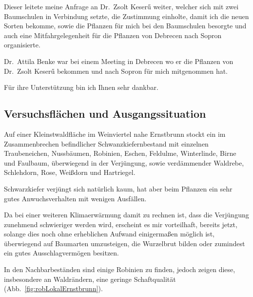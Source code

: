 \documentclass[twocolumn]{scrartcl}
\begin{document}
Dieser leitete meine Anfrage an Dr.~Zsolt Keserű weiter, welcher sich
mit zwei Baumschulen in Verbindung setzte, die Zustimmung einholte,
damit ich die neuen Sorten bekomme, sowie die Pflanzen für mich bei
den Baumschulen besorgte und auch eine Mitfahrgelegenheit für die
Pflanzen von Debrecen nach Sopron organisierte.

Dr.~Attila Benke war bei einem Meeting in Debrecen wo er die Pflanzen
von Dr.~Zsolt Keserű bekommen und nach Sopron für mich mitgenommen
hat.

Für ihre Unterstützung bin ich Ihnen sehr dankbar.

\subsection{Versuchsflächen und Ausgangssituation}

Auf einer Kleinstwaldfläche im Weinviertel nahe Ernstbrunn stockt ein
im Zusammenbrechen befindlicher Schwanzkiefernbestand mit einzelnen
Traubeneichen, Nussbäumen, Robinien, Eschen, Feldulme, Winterlinde,
Birne und Faulbaum, überwiegend in der Verjüngung, sowie verdämmender
Waldrebe, Schlehdorn, Rose, Weißdorn und Hartriegel.

Schwarzkiefer verjüngt sich natürlich kaum, hat aber beim Pflanzen ein
sehr gutes Anwuchsverhalten mit wenigen Ausfällen.

Da bei einer weiteren Klimaerwärmung damit zu rechnen ist, dass die
Verjüngung zunehmend schwieriger werden wird, erscheint es mir
vorteilhaft, bereits jetzt, solange dies noch ohne erheblichen Aufwand
einigermaßen möglich ist, überwiegend auf Baumarten umzusteigen, die
Wurzelbrut bilden oder zumindest ein gutes Ausschlagvermögen besitzen.

In den Nachbarbeständen sind einige Robinien zu finden, jedoch zeigen
diese, insbesondere an Waldrändern, eine geringe Schaftqualität
(Abb.~\ref{fig:robLokalErnstbrunn}).
\end{document}
